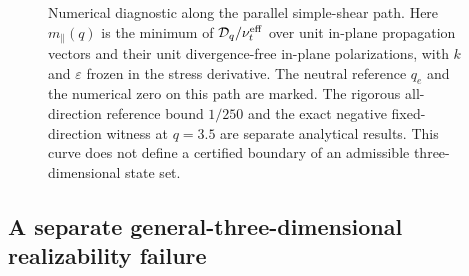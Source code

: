 \documentclass[11pt,a4paper]{article}
\numberwithin{equation}{section}
\begin{document}
\begin{figure}[tbp]
\caption{Numerical diagnostic along the parallel simple-shear path.
Here $m_{\parallel}(q)$ is the minimum of
$\mathcal D_q/\nu_t^{\rm eff}$ over unit in-plane propagation vectors
and their unit divergence-free in-plane polarizations, with $k$ and
$\varepsilon$ frozen in the stress derivative. The neutral reference
$q_e$ and the numerical zero on this path are marked. The rigorous
all-direction reference bound $1/250$ and the exact negative
fixed-direction witness at $q=3.5$ are separate analytical results.
This curve does not define a certified boundary of an admissible
three-dimensional state set.}
\label{fig:wjstab-shear-path}
\end{figure}

\subsection{A separate general-three-dimensional realizability failure}
\end{document}
